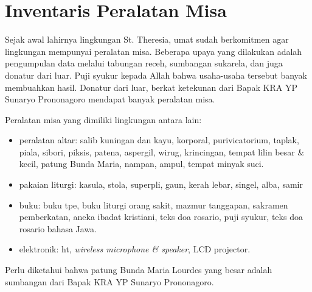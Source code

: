 \section{Inventaris Peralatan Misa}
Sejak awal lahirnya lingkungan St. Theresia, umat sudah berkomitmen agar lingkungan mempunyai peralatan misa. Beberapa upaya yang dilakukan adalah pengumpulan data melalui tabungan receh, sumbangan sukarela, dan juga donatur dari luar. Puji syukur kepada Allah bahwa usaha-usaha tersebut banyak membuahkan hasil. Donatur dari luar, berkat ketekunan dari Bapak KRA YP Sunaryo Prononagoro mendapat banyak peralatan misa. 

Peralatan misa yang dimiliki lingkungan antara lain:
\begin{itemize}
\item peralatan altar: salib kuningan dan kayu,
korporal,
purivicatorium,
taplak,
piala,
sibori,
piksis,
patena,
aspergil,
wirug,
krincingan,
tempat lilin besar \& kecil,
patung Bunda Maria,
nampan, ampul,
tempat minyak suci.
\item pakaian liturgi: kasula,
stola,
superpli,
gaun,
kerah lebar,
singel,
alba,
samir
\item buku: buku tpe,
buku liturgi orang sakit,
mazmur tanggapan, sakramen pemberkatan,
aneka ibadat kristiani, teks doa rosario,
puji syukur, teks doa rosario bahasa Jawa.
\item elektronik: ht, \textit{wireless microphone \& speaker}, LCD projector.
\end{itemize} 

Perlu diketahui bahwa patung Bunda Maria Lourdes yang besar adalah sumbangan dari Bapak KRA YP Sunaryo Prononagoro.


